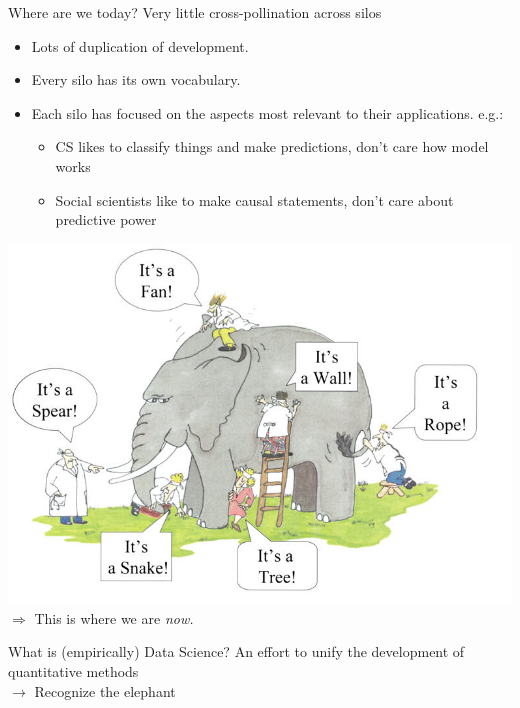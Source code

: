 \documentclass[11pt]{beamer}
\begin{document}
\begin{frame}[c]{Where are we today?}
Very little cross-pollination across silos
\begin{itemize}
	\pause \item Lots of duplication of development.
	\pause \item Every silo has its own vocabulary.
	\pause \item Each silo has focused on the aspects most relevant to their applications. e.g.:
	\begin{itemize}
		\pause \item CS likes to classify things and make predictions, don't care how model works
		\item Social scientists like to make causal statements, don't care about predictive power
	\end{itemize}
\end{itemize}
\end{frame}

\begin{frame}[c]{}
\pause \includegraphics[width=\textwidth]{blindmenelephant.jpg}
\pause $\Rightarrow$ This is where we are \emph{now.}
\end{frame}

\begin{frame}[c]{What is (empirically) Data Science?}
\pause An effort to unify the development of quantitative methods \\
\pause $\rightarrow$ Recognize the elephant
\end{frame}
\end{document}
